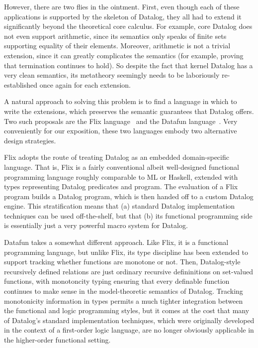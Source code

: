 However, there are two flies in the ointment. First, even though each
of these applications is supported by the skeleton of Datalog, they
all had to extend it significantly beyond the theoretical core
calculus.  For example, core Datalog does not even support arithmetic,
since its semantics only speaks of finite sets supporting equality of
their elements. Moreover, arithmetic is not a trivial extension, since
it can greatly complicates the semantics (for example, proving that
termination continues to hold). So despite the fact that kernel
Datalog has a very clean semantics, its metatheory seemingly needs to
be laboriously re-established once again for each extension.

A natural approach to solving this problem is to find a language in
which to write the extensions, which preserves the semantic guarantees
that Datalog offers. Two such proposals are the Flix
language~\cite{flix} and the Datafun language~\cite{datafun}.  Very
conveniently for our exposition, these two languages embody two
alternative design strategies.

Flix adopts the route of treating Datalog as an embedded
domain-specific language. That is, Flix is a fairly conventional
albeit well-designed functional programming language roughly
comparable to ML or Haskell, extended with types representing Datalog
predicates and program. The evaluation of a Flix program builds a
Datalog program, which is then handed off to a custom Datalog engine.
This stratification means that (a) standard Datalog implementation
techniques can be used off-the-shelf, but that (b) its functional
programming side is essentially just a very powerful macro system for
Datalog.

Datafun takes a somewhat different approach. Like Flix, it is a
functional programming language, but unlike Flix, its type discipline
has been extended to support tracking whether functions are monotone
or not. Then, Datalog-style recursively defined relations are just
ordinary recursive defininitions on set-valued functions, with
monotoncity typing ensuring that every definable function continues to
make sense in the model-theoretic semantics of Datalog. Tracking
monotonicity information in types permits a much tighter integration
between the functional and logic programming styles, but it comes at
the cost that many of Datalog's standard implementation techniques,
which were originally developed in the context of a first-order logic
language, are no longer obviously applicable in the higher-order
functional setting.


